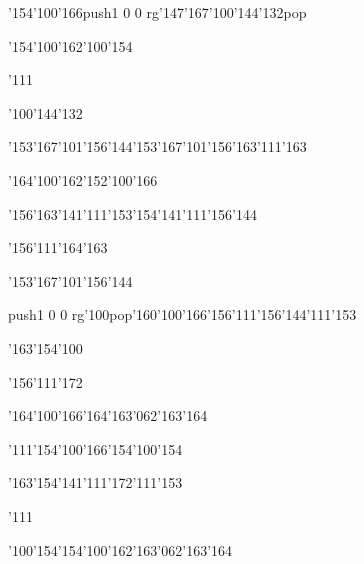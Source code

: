 \null\vfill\ipa\centerline{\enskip\enskip\enskip\enskip\char'154\char'100\char'166\enskip\pdfcolorstack\match push{1 0 0 rg}\char'147\char'167\char'100\char'144\char'132\pdfcolorstack\match pop{}}\medskip\centerline{\enskip\enskip\enskip\char'154\char'100\char'162\enskip\enskip\enskip\enskip\enskip\enskip\char'100\char'154}\medskip\centerline{\enskip\char'111\enskip\enskip\enskip\enskip\enskip\enskip\enskip\enskip\enskip\enskip}\medskip\centerline{\enskip\enskip\enskip\enskip\char'100\char'144\char'132\enskip\enskip\enskip\enskip\enskip\enskip\enskip}\medskip\centerline{\enskip\enskip\enskip\enskip\enskip\char'153\char'167\char'101\char'156\char'144\enskip\char'153\char'167\char'101\char'156\char'163\enskip\char'111\char'163}\medskip\centerline{\enskip\enskip\enskip\enskip\enskip\enskip\enskip\char'164\char'100\char'162\enskip\char'152\char'100\char'166\enskip\enskip\enskip}\medskip\centerline{\enskip\char'156\char'163\char'141\char'111\char'153\enskip\enskip\enskip\enskip\char'154\char'141\char'111\char'156\char'144\enskip\enskip\enskip}\medskip\centerline{\enskip\enskip\enskip\enskip\enskip\enskip\enskip\enskip\enskip\enskip\enskip\enskip}\medskip\centerline{\enskip\enskip\enskip\enskip\enskip\enskip\enskip\enskip\enskip\enskip\enskip\char'156\char'111\char'164\char'163}\medskip\vfill\footline{\hfil\tt\folio\hfil}\eject
\null\vfill\ipa\centerline{\enskip\enskip\enskip\enskip\enskip\enskip\enskip\enskip\char'153\char'167\char'101\char'156\char'144}\medskip\centerline{\enskip\pdfcolorstack\match push{1 0 0 rg}\char'100\pdfcolorstack\match pop{}\enskip\char'160\char'100\char'166\enskip\char'156\char'111\char'156\char'144\enskip\char'111\char'153}\medskip\centerline{\enskip\enskip\enskip\char'163\char'154\char'100\enskip\enskip\enskip\enskip\enskip\enskip}\medskip\centerline{\enskip\enskip\enskip\enskip\enskip\enskip\enskip\enskip\enskip\enskip\enskip\char'156\char'111\char'172}\medskip\centerline{\enskip\char'164\char'100\char'166\enskip\enskip\enskip\enskip\enskip\enskip\enskip\char'164\char'163\char'062\char'163\char'164\enskip\enskip\enskip}\medskip\centerline{\enskip\char'111\enskip\char'154\char'100\char'166\enskip\enskip\enskip\enskip\enskip\char'154\char'100\char'154\enskip\enskip\enskip}\medskip\centerline{\enskip\char'163\char'154\char'141\char'111\char'172\enskip\enskip\enskip\enskip\enskip\enskip\enskip\enskip\enskip\enskip\char'111\char'153}\medskip\centerline{\enskip\char'111\enskip\enskip\enskip\enskip\enskip\enskip\enskip\enskip\enskip\enskip}\medskip\centerline{\enskip\char'100\char'154\enskip\enskip\enskip\enskip\char'154\char'100\char'162\enskip\char'163\char'062\char'163\char'164}\medskip\vfill\footline{\hfil\tt\folio\hfil}\eject

